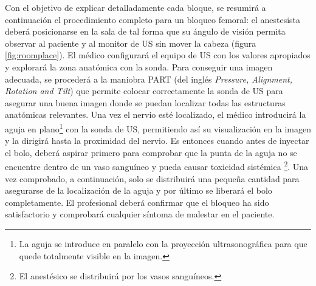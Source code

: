 Con el objetivo de explicar detalladamente cada bloque, se resumirá a continuación el procedimiento completo para un bloqueo femoral:
%
el anestesista deberá posicionarse en la sala de tal forma que su ángulo de visión permita observar al paciente y al monitor de \ac{US} %
sin mover la cabeza (figura \ref{fig:roomplace}). El médico configurará el equipo de \ac{US} con los valores apropiados y explorará la zona anatómica con la sonda. Para conseguir una imagen adecuada, se procederá a la maniobra PART (del inglés \emph{Pressure, Alignment, Rotation and Tilt}) que permite colocar correctamente la sonda de \ac{US} para asegurar una buena imagen donde se puedan localizar todas las estructuras anatómicas relevantes. Una vez el nervio esté localizado, el médico introducirá la aguja en plano\footnote{La aguja se introduce en paralelo con la proyección ultrasonográfica para que quede totalmente visible en la imagen.} con la sonda de \ac{US}, permitiendo así su visualización en la imagen y la dirigirá hasta la proximidad del nervio. Es entonces cuando antes de inyectar el bolo, deberá aspirar primero para comprobar que la punta de la aguja no se encuentre dentro de un vaso sanguíneo y pueda causar toxicidad sistémica \footnote{El anestésico se distribuirá por los vasos sanguíneos.}. Una vez comprobado, a continuación, solo se distribuirá una pequeña cantidad para asegurarse de la localización de la aguja y por último se liberará el bolo completamente. El profesional deberá confirmar que el bloqueo ha sido satisfactorio y comprobará cualquier síntoma de malestar en el paciente.


